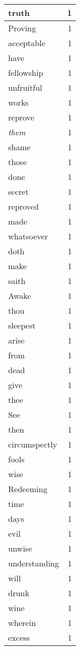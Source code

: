 \begin{center}
\begin{longtable}{l|r}
truth & 1\\ \hline 
Proving & 1\\ \hline 
acceptable & 1\\ \hline 
have & 1\\ \hline 
fellowship & 1\\ \hline 
unfruitful & 1\\ \hline 
works & 1\\ \hline 
reprove & 1\\ \hline 
\emph{them} & 1\\ \hline 
shame & 1\\ \hline 
those & 1\\ \hline 
done & 1\\ \hline 
secret & 1\\ \hline 
reproved & 1\\ \hline 
made & 1\\ \hline 
whatsoever & 1\\ \hline 
doth & 1\\ \hline 
make & 1\\ \hline 
saith & 1\\ \hline 
Awake & 1\\ \hline 
thou & 1\\ \hline 
sleepest & 1\\ \hline 
arise & 1\\ \hline 
from & 1\\ \hline 
dead & 1\\ \hline 
give & 1\\ \hline 
thee & 1\\ \hline 
See & 1\\ \hline 
then & 1\\ \hline 
circumspectly & 1\\ \hline 
fools & 1\\ \hline 
wise & 1\\ \hline 
Redeeming & 1\\ \hline 
time & 1\\ \hline 
days & 1\\ \hline 
evil & 1\\ \hline 
unwise & 1\\ \hline 
understanding & 1\\ \hline 
will & 1\\ \hline 
drunk & 1\\ \hline 
wine & 1\\ \hline 
wherein & 1\\ \hline 
excess & 1\\ \hline 

\end{longtable}
\end{center}
